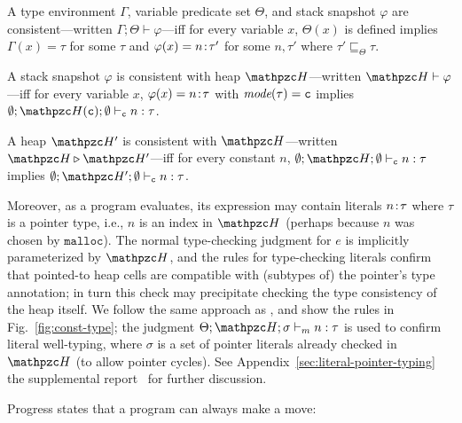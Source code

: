 \begin{defi}
A type environment $\Gamma$, variable predicate set $\Theta$, and
stack snapshot $\varphi$ are consistent---written $\Gamma;\Theta\vdash
\varphi$---iff for every variable $x$, $\Theta(x)$ is defined implies
$\Gamma(x) = \tau$ for some $\tau$ and 
$\varphi(x) ={n}\!:\!{\tau'}$ for some $n,\tau'$ where $\tau' \sqsubseteq_{\Theta} \tau$. 
\end{defi}

\begin{defi}
A stack snapshot $\varphi$ is consistent with heap $\heap$---written $\heap \vdash \varphi$---iff
for every variable $x$, $\varphi(x)= {n}\!:\!{\tau}$ with $\textit{mode}(\tau)=\texttt{c}$ implies $\emptyset;\heap(\cmode);\emptyset \vdash_{\cmode} n:\tau$.
\end{defi}

\begin{defi}
A heap $\heap'$ is consistent with $\heap$---written $\heap \triangleright \heap'$---iff
for every constant $n$, $\emptyset;\heap;\emptyset \vdash_{\cmode} n:\tau$ implies $\emptyset;\heap';\emptyset \vdash_{\cmode} n:\tau$.
\end{defi}

Moreover, as a program evaluates, its expression may contain literals
${n}\!:\!{\tau}$ where $\tau$ is a pointer type, i.e., $n$ is an
index in $\heap$ (perhaps because $n$ was chosen by
$\mathtt{malloc}$). The normal type-checking judgment for $e$ is
implicitly parameterized by $\heap$, and the rules for type-checking
literals confirm that pointed-to heap cells are compatible with
(subtypes of) the pointer's type annotation; in turn this check may
precipitate checking the type consistency of the heap itself. We
follow the same approach as \citet{ruef18checkedc-incr}, and show the
rules in
  Fig.~\ref{fig:const-type}; the judgment
  $\Theta;\heap;\sigma \vdash_m n : \tau$ is used to confirm literal
  well-typing, where $\sigma$ is a set of pointer literals already
  checked in $\heap$ (to allow pointer cycles). See
  \iftr
  Appendix~\ref{sec:literal-pointer-typing}
  \else
  the supplemental report~\cite{checkedc-tech-report}
  \fi
   for further discussion.

Progress states that a \systemname program can always make a move:

